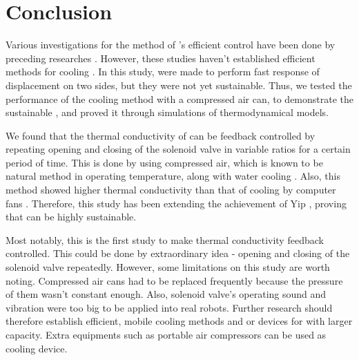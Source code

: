 \section{Conclusion}
Various investigations for the method of \scpnospace's efficient control have been done by preceding researches \cite{haines,mirvakili,yip}. %
However, these studies haven't established efficient methods for cooling \scpnospace. %
In this study, \antas were made to perform fast response of displacement on two sides, but they were not yet sustainable. Thus, we tested the performance of the cooling method with a compressed air can, to demonstrate the sustainable \apcnospace, and proved it through simulations of thermodynamical models. %

We found that the thermal conductivity of \scp can be feedback controlled by repeating opening and closing of the solenoid valve in variable ratios for a certain period of time. %
This is done by using compressed air, which is known to be natural method in operating temperature, along with water cooling \cite{madden}.
Also, this method showed higher thermal conductivity than that of cooling by computer fans \cite{yip}.
Therefore, this study has been extending the achievement of Yip \etal, proving that \apc can be highly sustainable.

Most notably, this is the first study to make thermal conductivity feedback controlled. This could be done by extraordinary idea - opening and closing of the  solenoid valve repeatedly.
However, some limitations on this study are worth noting. 
Compressed air cans had to be replaced frequently because the pressure of them wasn't constant enough. 
Also, solenoid valve's operating sound and vibration were too big to be applied into real robots.
Further research should therefore establish efficient, mobile cooling methods and or devices for \scps with larger capacity. 
Extra equipments such as portable air compressors can be used as cooling device.



